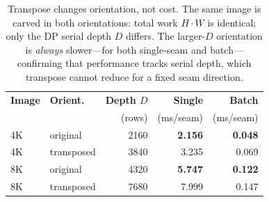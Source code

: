 \begin{table}[h!]
\caption{Transpose changes orientation, not cost. The same image is carved in
both orientations: total work $H{\cdot}W$ is identical; only the DP serial depth
$D$ differs. The larger-$D$ orientation is \emph{always} slower---for both
single-seam and batch---confirming that performance tracks serial depth, which
transpose cannot reduce for a fixed seam direction.}
\label{tab:depth}
\centering
\begin{tabular}{@{}llrrr@{}}
\toprule
\textbf{Image} & \textbf{Orient.} & \textbf{Depth $D$} &
\textbf{Single} & \textbf{Batch} \\
 & & (rows) & (ms/seam) & (ms/seam) \\
\midrule
4K & original   & 2160 & \textbf{2.156} & \textbf{0.048} \\
4K & transposed & 3840 & 3.235 & 0.069 \\
\midrule
8K & original   & 4320 & \textbf{5.747} & \textbf{0.122} \\
8K & transposed & 7680 & 7.999 & 0.147 \\
\bottomrule
\end{tabular}
\end{table}
